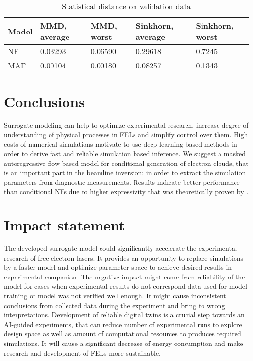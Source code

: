 \documentclass{article}
\begin{document}
\begin{table}
  \caption{Statistical distance on validation data}
  \label{tab:metrics}
  \centering
  \begin{tabular}{lllll}
    \toprule
    Model     & MMD, average & MMD, worst & Sinkhorn, average & Sinkhorn, worst \\
    \midrule
    NF & 0.03293 & 0.06590 & 0.29618 & 0.7245 \\
    MAF & 0.00104 & 0.00180 & 0.08257 & 0.1343 \\
    \bottomrule
  \end{tabular}
\end{table}


\section{Conclusions}
Surrogate modeling can help to optimize experimental research, increase degree of understanding of physical processes in FELs and simplify control over them.
High costs of numerical simulations motivate to use deep learning based methods in order to derive fast and reliable simulation based inference. 
We suggest a masked autoregressive flow based model for conditional generation of electron clouds, that is an important part in the beamline inversion: in order to extract the simulation parameters from diagnostic measurements. 
Results indicate better performance than conditional NFs due to higher expressivity that was theoretically proven by \citet{maf}.  

\section{Impact statement} \label{sec:impact}

The developed surrogate model could significantly accelerate the experimental research of free electron lasers. 
It provides an opportunity to replace simulations by a faster model and optimize parameter space to achieve desired results in experimental companion. 
The negative impact might come from reliability of the model for cases when experimental results do not correspond data used for model training or model was not verified well enough. 
It might cause inconsistent conclusions from collected data during the experiment and bring to wrong interpretations. 
Development of reliable digital twins is a crucial step towards an AI-guided experiments, that can reduce number of experimental runs to explore design space as well as amount of computational resources to produces required simulations. 
It will cause a significant decrease of energy consumption and make research and development of FELs more sustainable.
\end{document}
